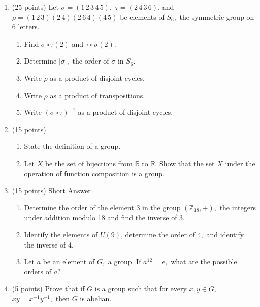 \documentclass[12pt]{article}
\begin{document}
\begin{enumerate}
\item (25 points) Let $\sigma=(1 \, 2 \, 3 \, 4 \, 5 ),$  $\tau = (2 \, 4 \, 3 \, 6)$, and $\rho=(1 \, 2 \, 3 )(2 \,4) (2 \, 6 \, 4) (4 \, 5)$ be elements of $S_6,$ the symmetric group on 6 letters.
	\begin{enumerate}
	\item Find $\sigma \circ \tau (2)$ and $\tau \circ \sigma (2).$
	\vfill
	\item Determine $| \sigma |,$ the order of $\sigma$ in $S_6.$
	\vfill
	\item Write $\rho$ as a product of disjoint cycles.
	\vfill
	\item Write $\rho$ as a product of transpositions.	
	\vfill
	\item Write $(\sigma \circ \tau )^{-1}$ as a product of disjoint cycles.
	\vfill
	\end{enumerate}
\newpage
\item (15 points)
	\begin{enumerate}
	\item State the definition of a group.
	\vspace{2in}
	\item Let $X$ be the set of bijections from $\mathbb{R}$ to $\mathbb{R}.$ Show that the set $X$ under the operation of function composition is a group. 
	\vfill
	\end{enumerate}
\newpage
\item (15 points) Short Answer
	\begin{enumerate}
	\item Determine the order of the element $3$ in the group $( \mathbb{Z}_{18}, +),$ the integers under addition modulo 18 and find the inverse of 3.
	\vfill
	\item Identify the elements of $U(9)$, determine the order of $4,$ and identify the inverse of 4.
	\vfill
	\item Let $a$ be an element of $G,$ a group. If $a^{12}=e,$ what are the possible orders of $a$?
	\vfill
	\end{enumerate}
\newpage
\item (5 points) Prove that if $G$ is a group such that for every $x,y \in G,$ $xy=x^{-1}y^{-1},$ then $G$ is abelian.
\end{enumerate}
\end{document}
